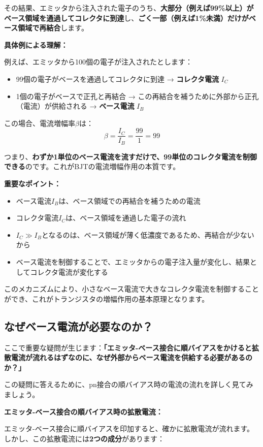 その結果、エミッタから注入された電子のうち、\textbf{大部分（例えば99\%以上）がベース領域を通過してコレクタに到達}し、\textbf{ごく一部（例えば1\%未満）だけがベース領域で再結合}します。

\textbf{具体例による理解：}

例えば、エミッタから100個の電子が注入されたとします：
\begin{itemize}
\item 99個の電子がベースを通過してコレクタに到達 → \textbf{コレクタ電流} $I_C$
\item 1個の電子がベースで正孔と再結合 → この再結合を補うために外部から正孔（電流）が供給される → \textbf{ベース電流} $I_B$
\end{itemize}

この場合、電流増幅率$\beta$は：
\[
\beta = \frac{I_C}{I_B} = \frac{99}{1} = 99
\]

つまり、\textbf{わずか1単位のベース電流を流すだけで、99単位のコレクタ電流を制御できる}のです。これがBJTの電流増幅作用の本質です。

\textbf{重要なポイント：}

\begin{itemize}
\item ベース電流$I_B$は、ベース領域での再結合を補うための電流
\item コレクタ電流$I_C$は、ベース領域を通過した電子の流れ
\item $I_C \gg I_B$となるのは、ベース領域が薄く低濃度であるため、再結合が少ないから
\item ベース電流を制御することで、エミッタからの電子注入量が変化し、結果としてコレクタ電流が変化する
\end{itemize}

このメカニズムにより、小さなベース電流で大きなコレクタ電流を制御することができ、これがトランジスタの増幅作用の基本原理となります。

\subsection{なぜベース電流が必要なのか？}

ここで重要な疑問が生じます：\textbf{「エミッタ-ベース接合に順バイアスをかけると拡散電流が流れるはずなのに、なぜ外部からベース電流を供給する必要があるのか？」}

この疑問に答えるために、pn接合の順バイアス時の電流の流れを詳しく見てみましょう。

\textbf{エミッタ-ベース接合の順バイアス時の拡散電流：}

エミッタ-ベース接合に順バイアスを印加すると、確かに拡散電流が流れます。しかし、この拡散電流には\textbf{2つの成分}があります：

